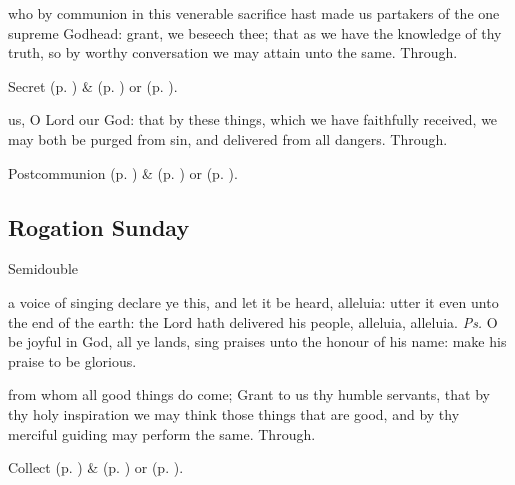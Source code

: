 \clearpage
\secret
{} who by communion in this venerable sacrifice hast made us partakers of the one supreme Godhead: grant, we beseech thee; that as we have the knowledge of thy truth, so by worthy conversation we may attain unto the same. Through.
\begin{rubric}
     Secret  (p. \pageref{SPMaryInEaster}) \&   (p. \pageref{SPAgainst}) or  (p. \pageref{SPChiefBishop}).
\end{rubric}
\postcommunion
{} us, O Lord our God: that by these things, which we have faithfully received, we may both be purged from sin, and delivered from all dangers. Through.
\begin{rubric}
     Postcommunion  (p. \pageref{SPMaryInEaster}) \&   (p. \pageref{SPAgainst}) or  (p. \pageref{SPChiefBishop}).
\end{rubric}


\subsection{Rogation Sunday}
\begin{inhead}
    {Semidouble}
\end{inhead}


\introit
{} a voice of singing declare ye this, and let it be heard, alleluia: utter it even unto the end of the earth: the Lord hath delivered his people, alleluia, alleluia. \textit{Ps.} O be joyful in God, all ye lands, sing praises unto the honour of his name: make his praise to be glorious.

\collect
{} from whom all good things do come; Grant to us thy humble servants, that by thy holy inspiration we may think those things that are good, and by thy merciful guiding may perform the same. Through.
\begin{rubric}
     Collect  (p. \pageref{SPMaryInEaster}) \&   (p. \pageref{SPAgainst}) or  (p. \pageref{SPChiefBishop}).
\end{rubric}

